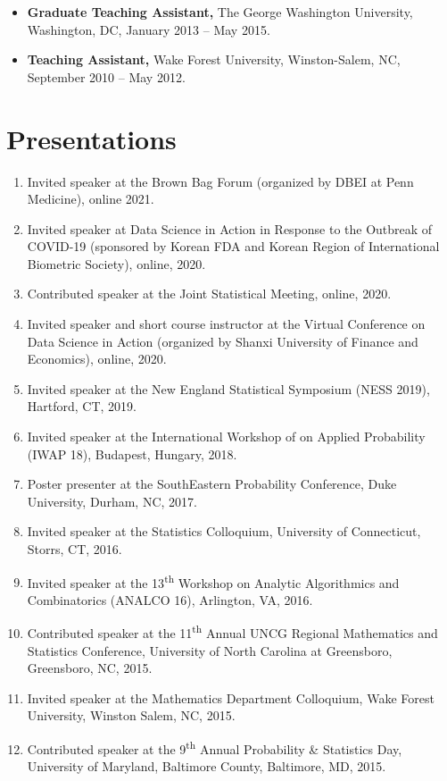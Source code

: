 \documentclass[margin]{res}
\begin{document}
\begin{resume}
\begin{itemize}
	\item{\bf Graduate Teaching Assistant,} The George Washington University, Washington, DC, January 2013 -- May 2015.
	
	\item{\bf Teaching Assistant,} Wake Forest University, Winston-Salem, NC, September 2010 -- May 2012.
\end{itemize}

\section{Presentations}
\begin{enumerate}
	\item Invited speaker at the Brown Bag Forum (organized by DBEI 
	at Penn Medicine), online 2021.
	\item Invited speaker at Data Science in Action in Response to 
	the Outbreak of COVID-19 (sponsored by Korean FDA and Korean 
	Region of International Biometric Society), online, 2020.
	\item Contributed speaker at the Joint Statistical Meeting, 
	online, 2020.
	\item Invited speaker and short course instructor at the Virtual 
	Conference on Data Science in Action (organized by Shanxi 
	University of Finance and Economics), online, 2020.
	\item Invited speaker at the New England Statistical Symposium (NESS 2019), Hartford, CT, 2019.
	\item Invited speaker at the International Workshop of on Applied Probability (IWAP 18), Budapest, Hungary, 2018.
	\item Poster presenter at the SouthEastern Probability Conference, Duke University, Durham, NC, 2017.
	\item Invited speaker at the Statistics Colloquium, University of Connecticut, Storrs, CT, 2016.
	\item Invited speaker at the 13\textsuperscript{th} Workshop on Analytic Algorithmics and Combinatorics (ANALCO 16), Arlington, VA, 2016.
	\item Contributed speaker at the 11\textsuperscript{th} Annual UNCG Regional Mathematics and Statistics Conference, University of North Carolina at Greensboro, Greensboro, NC, 2015.
	\item Invited speaker at the Mathematics Department Colloquium, Wake Forest University, Winston Salem, NC, 2015. 
	\item Contributed speaker at the 9\textsuperscript{th} Annual Probability \& Statistics Day, University of Maryland, Baltimore County, Baltimore, MD, 2015.

\end{enumerate}
\end{resume}
\end{document}
